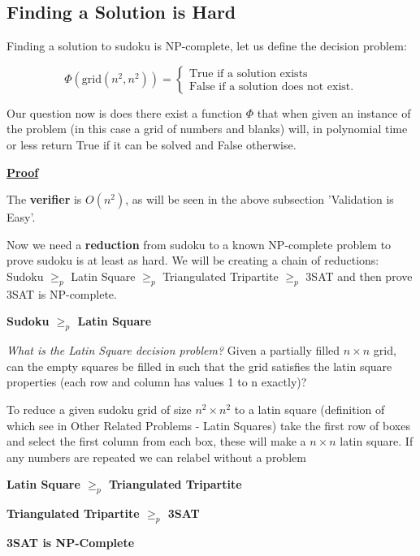 \documentclass[a4paper,12pt]{article}
\begin{document}
	\subsection{Finding a Solution is Hard}
		
Finding a solution to sudoku is NP-complete, let us define the decision problem:

		\begin{equation}
		        \Phi (\text{grid}(n^2,n^2)) = \begin{cases}
		            \text{True if a solution exists} \\
		            \text{False if a solution does not exist}.
				\end{cases}
		\end{equation}

Our question now is does there exist a function $\Phi$ that when given an instance of the problem (in this case a grid of numbers and blanks) will, in polynomial time or less return True if it can be solved and False otherwise.

\textbf{\underline{Proof}}

The \textbf{verifier} is $O(n^2)$, as will be seen in the above subsection 'Validation is Easy'.

Now we need a \textbf{reduction} from sudoku to a known NP-complete problem to prove sudoku is at least as hard. We will be creating a chain of reductions: Sudoku $\geq_p$  Latin Square $\geq_p$  Triangulated Tripartite $\geq_p$  3SAT and then prove 3SAT is NP-complete.

\textbf{Sudoku $\geq_p$ Latin Square}

\textit{What is the Latin Square decision problem?} Given a partially filled $n \times n$ grid, can the empty squares be filled in such that the grid satisfies the latin square properties (each row and column has values 1 to n exactly)?

To reduce a given sudoku grid of size $n^2 \times n^2$ to a latin square (definition of which see in Other Related Problems - Latin Squares) take the first row of boxes and select the first column from each box, these will make a $n \times n$ latin square. If any numbers are repeated we can relabel without a problem 

\textbf{Latin Square $\geq_p$ Triangulated Tripartite}

\textbf{Triangulated Tripartite $\geq_p$ 3SAT}

\textbf{3SAT is NP-Complete}
\end{document}
